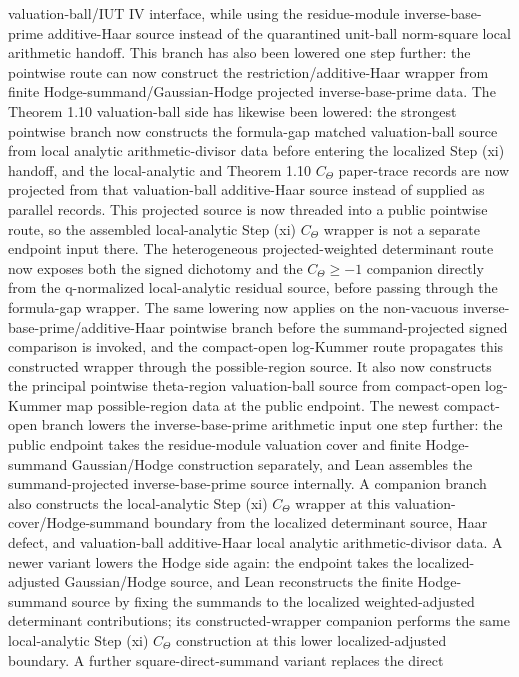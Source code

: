 \documentclass[11pt]{article}
\theoremstyle{plain}
\theoremstyle{definition}
\theoremstyle{remark}
\begin{document}
valuation-ball/IUT IV interface, while using the residue-module
inverse-base-prime additive-Haar source instead of the quarantined unit-ball
norm-square local arithmetic handoff.  This branch has also been lowered one
step further: the pointwise route can now construct the
restriction/additive-Haar wrapper from finite Hodge-summand/Gaussian-Hodge
projected inverse-base-prime data.  The Theorem 1.10 valuation-ball side has
likewise been lowered: the strongest pointwise branch now constructs the
formula-gap matched valuation-ball source from local analytic
arithmetic-divisor data before entering the localized Step (xi) handoff, and
the local-analytic and Theorem 1.10 \(C_{\Theta}\) paper-trace records are now
projected from that valuation-ball additive-Haar source instead of supplied as
parallel records.  This projected source is now threaded into a public
pointwise route, so the assembled local-analytic Step (xi) \(C_{\Theta}\)
wrapper is not a separate endpoint input there.  The heterogeneous
projected-weighted determinant route now exposes both the signed dichotomy and
the \(C_{\Theta}\geq -1\) companion directly from the q-normalized
local-analytic residual source, before passing through the formula-gap
wrapper.  The same lowering now applies
on the non-vacuous inverse-base-prime/additive-Haar pointwise branch before
the summand-projected signed comparison is invoked, and the compact-open
log-Kummer route propagates this constructed wrapper through the
possible-region source.  It
also now constructs the principal pointwise theta-region valuation-ball source
from compact-open log-Kummer map possible-region data at the public endpoint.
The newest compact-open branch lowers the inverse-base-prime arithmetic input
one step further: the public endpoint takes the residue-module valuation cover
and finite Hodge-summand Gaussian/Hodge construction separately, and Lean
assembles the summand-projected inverse-base-prime source internally.  A
companion branch also constructs the local-analytic Step (xi) \(C_{\Theta}\)
wrapper at this valuation-cover/Hodge-summand boundary from the localized
determinant source, Haar defect, and valuation-ball additive-Haar local
analytic arithmetic-divisor data.  A newer
variant lowers the Hodge side again: the endpoint takes the localized-adjusted
Gaussian/Hodge source, and Lean reconstructs the finite Hodge-summand source by
fixing the summands to the localized weighted-adjusted determinant
contributions; its constructed-wrapper companion performs the same
local-analytic Step (xi) \(C_{\Theta}\) construction at this lower
localized-adjusted boundary.  A further square-direct-summand variant replaces the direct
\end{document}
